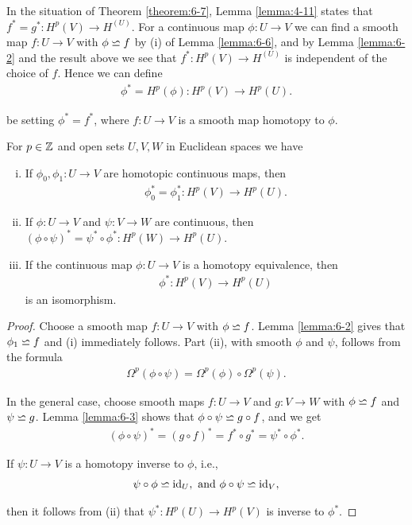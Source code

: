 In the situation of Theorem \ref{theorem:6-7}, Lemma \ref{lemma:4-11} states that 
$f^* = g^*: H^p(V)\to H^(U)$. For a continuous map $\phi: U\to V$ we can find a smooth map 
$f:U\to V$ with $\phi\backsimeq f$ by (i) of Lemma \ref{lemma:6-6}, and by Lemma \ref{lemma:6-2} and the result 
above we see that $f^*: H^p(V)\to H^(U)$ is independent of the choice of $f$. Hence we can define
\begin{align*}
  \phi^* = H^p(\phi): H^p(V)\to H^p(U).
\end{align*}

be setting $\phi^* = f^*$, where $f:U\to V$ is a smooth map homotopy to $\phi$.


\begin{theorem}\label{theorem:6-8}
For $p\in\mathbb{Z}$ and open sets $U, V, W$ in Euclidean spaces we have 
\begin{enumerate}[(i)]
  \item If $\phi_0, \phi_1:U\to V$ are homotopic continuous maps, then 
    \begin{align*}
      \phi_0^* = \phi_1^*: H^p(V)\to H^p(U).
    \end{align*}
  \item If $\phi:U\to V$ and $\psi:V\to W$ are continuous, then $(\phi\circ\psi)^* = \psi^*\circ\phi^*: H^p(W)\to H^p(U)$. 
  \item If the continuous map $\phi:U\to V$ is a homotopy equivalence, then 
    \begin{align*}
      \phi^*: H^p(V)\to H^p(U)
    \end{align*}
    is an isomorphism.
\end{enumerate}
\end{theorem}


\begin{proof}
Choose a smooth map $f:U\to V$ with $\phi\backsimeq f$. Lemma \ref{lemma:6-2} gives that
$\phi_1\backsimeq f$ and (i) immediately follows. Part (ii), with smooth $\phi$ and $\psi$, follows
from the formula
\begin{align*}
  \Omega^p(\phi\circ\psi) = \Omega^p(\phi)\circ\Omega^p(\psi).
\end{align*}

In the general case, choose smooth maps $f:U\to V$ and $g:V\to W$ with $\phi\backsimeq f$ and $\psi\backsimeq g$. Lemma \ref{lemma:6-3}
shows that $\phi\circ\psi\backsimeq g\circ f$, and we get 
\begin{align*}
  (\phi\circ\psi)^* = (g\circ f)^* = f^*\circ g^* = \psi^*\circ\phi^*.
\end{align*}

If $\psi:U\to V$ is a homotopy inverse to $\phi$, i.e.,
\begin{align*}
  \psi\circ\phi\backsimeq\operatorname{id}_U, \text{ and } \phi\circ\psi\backsimeq\operatorname{id}_V,
\end{align*}

then it follows from (ii) that $\psi^*:H^p(U)\to H^p(V)$ is inverse to $\phi^*$.
\end{proof}

